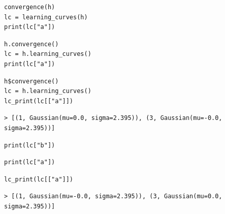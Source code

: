 \documentclass[a4paper,10pt]{book}
\theoremstyle{definition}
\newif\ifen
\newif\ifes
\newcommand{\en}[1]{\ifen#1\fi}
\newcommand{\es}[1]{\ifes#1\fi}
\begin{document}

\en{TrueSkill Through Time solves TrueSkill's inability to obtain correct estimates by allowing the information to propagate throughout the system. }%
\es{TrueSkill Through Time resuelve la incapacidad de TrueSkill para obtener las estimaciones correctas permitiendo que la información propague por todo el sistema. }%
%
\en{To compute them, we call the method \texttt{convergence()} of the class \texttt{History}. }%
\es{Para computarlas es necesario llamar al método \texttt{convergence()} de la clase \texttt{History}. }%
%
\begin{lstlisting}[backgroundcolor=\color{white},label=lst:ttt, caption={\en{Computing TrueSkill Through Time learning curves}\es{Computo de curvas de aprendizaje de TrueSkill Through Time}}, belowskip=-1.0 \baselineskip, aboveskip=0.1cm]
\end{lstlisting}
\begin{paracol}{3}
\begin{lstlisting}[backgroundcolor=\color{julia!60}, belowskip=-0.77 \baselineskip]
convergence(h)
lc = learning_curves(h)
print(lc["a"])
\end{lstlisting}
  \switchcolumn
\begin{lstlisting}[backgroundcolor=\color{python!60}, belowskip=-0.77 \baselineskip]
h.convergence()
lc = h.learning_curves()
print(lc["a"])
\end{lstlisting}
   \switchcolumn
\begin{lstlisting}[backgroundcolor=\color{r!50}, belowskip=-0.77 \baselineskip]
h$convergence()
lc = h.learning_curves()
lc_print(lc[["a"]])
\end{lstlisting}
\end{paracol}
\begin{lstlisting}[backgroundcolor=\color{all}, belowskip=-0.77 \baselineskip]
> [(1, Gaussian(mu=0.0, sigma=2.395)), (3, Gaussian(mu=-0.0, sigma=2.395))]
\end{lstlisting}
\begin{paracol}{3}
\begin{lstlisting}[backgroundcolor=\color{julia!60}, belowskip=-0.77 \baselineskip]
print(lc["b"])
\end{lstlisting}
  \switchcolumn
\begin{lstlisting}[backgroundcolor=\color{python!60}, belowskip=-0.77 \baselineskip]
print(lc["a"])
\end{lstlisting}
   \switchcolumn
\begin{lstlisting}[backgroundcolor=\color{r!50}, belowskip=-0.77 \baselineskip]
lc_print(lc[["a"]])
\end{lstlisting}
\end{paracol}
\begin{lstlisting}[backgroundcolor=\color{all}]
> [(1, Gaussian(mu=-0.0, sigma=2.395)), (3, Gaussian(mu=0.0, sigma=2.395))]
\end{lstlisting}
%
\en{TrueSkill Through Time not only returns correct estimates (same for all players), they also have less uncertainty. }%
\es{TrueSkill Through Time no sólo devuelve las estimaciones correctas (la misma para todos los jugadores), también tienen menos incertidumbre. }%
\end{document}

